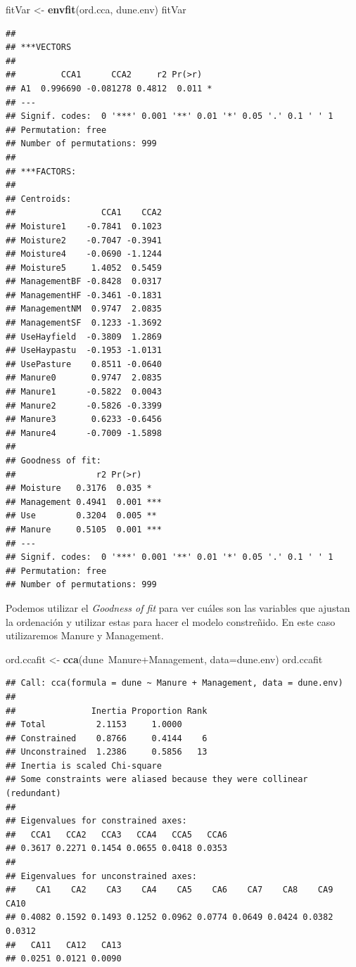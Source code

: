 \documentclass[]{book}
\newenvironment{Shaded}{\begin{snugshade}}{\end{snugshade}}
\newcommand{\KeywordTok}[1]{\textcolor[rgb]{0.13,0.29,0.53}{\textbf{{#1}}}}
\newcommand{\DataTypeTok}[1]{\textcolor[rgb]{0.13,0.29,0.53}{{#1}}}
\newcommand{\StringTok}[1]{\textcolor[rgb]{0.31,0.60,0.02}{{#1}}}
\newcommand{\NormalTok}[1]{{#1}}
\begin{document}
\begin{Shaded}
\begin{Highlighting}[]
\NormalTok{fitVar <-}\StringTok{ }\KeywordTok{envfit}\NormalTok{(ord.cca, dune.env)}
\NormalTok{fitVar}
\end{Highlighting}
\end{Shaded}

\begin{verbatim}
## 
## ***VECTORS
## 
##         CCA1      CCA2     r2 Pr(>r)  
## A1  0.996690 -0.081278 0.4812  0.011 *
## ---
## Signif. codes:  0 '***' 0.001 '**' 0.01 '*' 0.05 '.' 0.1 ' ' 1
## Permutation: free
## Number of permutations: 999
## 
## ***FACTORS:
## 
## Centroids:
##                 CCA1    CCA2
## Moisture1    -0.7841  0.1023
## Moisture2    -0.7047 -0.3941
## Moisture4    -0.0690 -1.1244
## Moisture5     1.4052  0.5459
## ManagementBF -0.8428  0.0317
## ManagementHF -0.3461 -0.1831
## ManagementNM  0.9747  2.0835
## ManagementSF  0.1233 -1.3692
## UseHayfield  -0.3809  1.2869
## UseHaypastu  -0.1953 -1.0131
## UsePasture    0.8511 -0.0640
## Manure0       0.9747  2.0835
## Manure1      -0.5822  0.0043
## Manure2      -0.5826 -0.3399
## Manure3       0.6233 -0.6456
## Manure4      -0.7009 -1.5898
## 
## Goodness of fit:
##                r2 Pr(>r)    
## Moisture   0.3176  0.035 *  
## Management 0.4941  0.001 ***
## Use        0.3204  0.005 ** 
## Manure     0.5105  0.001 ***
## ---
## Signif. codes:  0 '***' 0.001 '**' 0.01 '*' 0.05 '.' 0.1 ' ' 1
## Permutation: free
## Number of permutations: 999
\end{verbatim}

Podemos utilizar el \emph{Goodness of fit} para ver cuáles son las
variables que ajustan la ordenación y utilizar estas para hacer el
modelo constreñido. En este caso utilizaremos Manure y Management.

\begin{Shaded}
\begin{Highlighting}[]
\NormalTok{ord.ccafit <-}\StringTok{ }\KeywordTok{cca}\NormalTok{(dune~Manure+Management, }\DataTypeTok{data=}\NormalTok{dune.env)}
\NormalTok{ord.ccafit}
\end{Highlighting}
\end{Shaded}

\begin{verbatim}
## Call: cca(formula = dune ~ Manure + Management, data = dune.env)
## 
##               Inertia Proportion Rank
## Total          2.1153     1.0000     
## Constrained    0.8766     0.4144    6
## Unconstrained  1.2386     0.5856   13
## Inertia is scaled Chi-square 
## Some constraints were aliased because they were collinear (redundant)
## 
## Eigenvalues for constrained axes:
##   CCA1   CCA2   CCA3   CCA4   CCA5   CCA6 
## 0.3617 0.2271 0.1454 0.0655 0.0418 0.0353 
## 
## Eigenvalues for unconstrained axes:
##    CA1    CA2    CA3    CA4    CA5    CA6    CA7    CA8    CA9   CA10 
## 0.4082 0.1592 0.1493 0.1252 0.0962 0.0774 0.0649 0.0424 0.0382 0.0312 
##   CA11   CA12   CA13 
## 0.0251 0.0121 0.0090
\end{verbatim}
\end{document}
